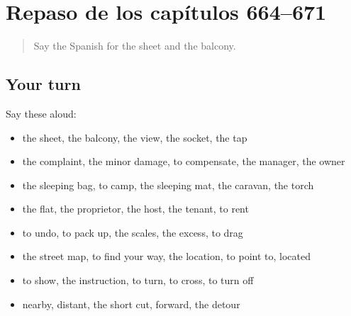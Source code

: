 \section[(dialogue)]{Repaso de los capítulos 664–671}

\label{lesson:ES-R671-repaso-664-671}



\begin{quote}
Say the Spanish for the sheet and the balcony.
\end{quote}

\subsection*{Your turn}
Say these aloud:

\begin{itemize}
\raggedright
  \item the sheet, the balcony, the view, the socket, the tap
  \item the complaint, the minor damage, to compensate, the manager, the owner
  \item the sleeping bag, to camp, the sleeping mat, the caravan, the torch
  \item the flat, the proprietor, the host, the tenant, to rent
  \item to undo, to pack up, the scales, the excess, to drag
  \item the street map, to find your way, the location, to point to, located
  \item to show, the instruction, to turn, to cross, to turn off
  \item nearby, distant, the short cut, forward, the detour
\end{itemize}

